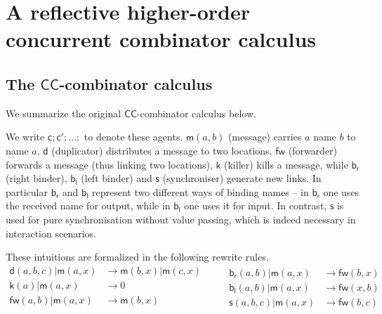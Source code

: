 \documentclass[submission,copyright,creativecommons]{eptcs}
\newcommand{\new}{\mathsf{new}}
\newcommand{\ccomb}{$\mathsf{CC}$-combinator calculus}
\newcommand{\bc}{\mathbin{\mathbf{::=}}}
\newcommand{\bm}{\mathbin{\mathbf\mid}}
\newcommand{\red}{\rightarrow}
\theoremstyle{definition}
\theoremstyle{remark}
\theoremstyle{remark}
\begin{document}
\section{A reflective higher-order concurrent combinator calculus}

\subsection{The {\ccomb}}

We summarize the original {\ccomb} \cite{DBLP:journals/tcs/Yoshida02} below.


We write $\mathsf{c};\mathsf{c'};\ldots;$ to denote these
agents. $\mathsf{m}(a,b)$ (message) carries $a$ name $b$ to name $a$,
$\mathsf{d}$ (duplicator) distributes a message to two locations,
$\mathsf{fw}$ (forwarder) forwards a message (thus linking two
locations), $\mathsf{k}$ (killer) kills a message, while
$\mathsf{b}_{\mathsf{r}}$ (right binder), $\mathsf{b}_{\mathsf{l}}$
(left binder) and $\mathsf{s}$ (synchroniser) generate new links. In
particular $\mathsf{b}_{\mathsf{r}}$ and $\mathsf{b}_{\mathsf{l}}$
represent two different ways of binding names – in
$\mathsf{b}_{\mathsf{r}}$ one uses the received name for output, while
in $\mathsf{b}_{\mathsf{l}}$ one uses it for input. In contrast,
$\mathsf{s}$ is used for pure synchronisation without value passing,
which is indeed necessary in interaction scenarios.

These intuitions are formalized in the following rewrite rules.
\[\begin{array}{rl}
  \mathsf{d}(a,b,c) | \mathsf{m}(a,x) & \red \mathsf{m}(b,x) | \mathsf{m}(c,x) \\
  \mathsf{k}(a) | \mathsf{m}(a,x) & \red 0 \\
  \mathsf{fw}(a,b) | \mathsf{m}(a,x) & \red \mathsf{m}(b,x) \\
\end{array} \quad \quad
\begin{array}{rl}
  \mathsf{b}_{\mathsf{r}}(a,b) | \mathsf{m}(a,x) & \red \mathsf{fw}(b,x) \\
  \mathsf{b}_{\mathsf{l}}(a,b) | \mathsf{m}(a,x) & \red \mathsf{fw}(x,b) \\
  \mathsf{s}(a,b,c) | \mathsf{m}(a,x) & \red \mathsf{fw}(b,c)
\end{array}\]
\end{document}

